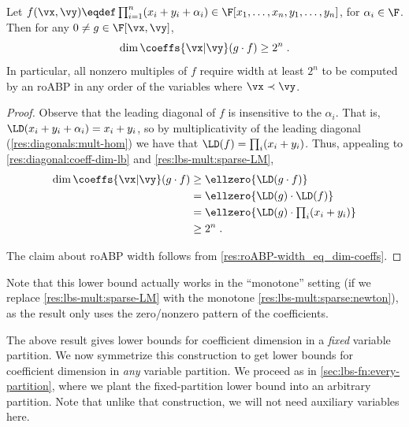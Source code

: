 \documentclass{toc}
\begin{document}
\begin{proposition}\label{prop:good-f-roabp}
        Let $f(\vx,\vy)\eqdef\prod_{i=1}^n (x_i+y_i+\alpha_i)\in\F[x_1,\ldots,x_n,y_1,\ldots,y_n]$, for $\alpha_i\in\F$.  Then for any $0\ne g\in\F[\vx,\vy]$,
        \[
                \dim\coeffs{\vx|\vy}(g\cdot f)\ge 2^n
                \;.
        \]
        In particular, all nonzero multiples of $f$ require width at least $2^n$ to be computed by an roABP in any order of the variables where $\vx\prec \vy$.
\end{proposition}
\begin{proof}
        Observe that the leading diagonal of $f$ is insensitive to the $\alpha_i$.  That is, $\LD(x_i+y_i+\alpha_i)=x_i+y_i$, so by multiplicativity of the leading diagonal (\autoref{res:diagonals:mult-hom}) we have that $\LD(f)=\prod_i (x_i+y_i)$.  Thus, appealing to \autoref{res:diagonal:coeff-dim-lb} and \autoref{res:lbs-mult:sparse-LM},
        \begin{align*}
                \dim\coeffs{\vx|\vy}(g\cdot f)
                &\ge \ellzero{\LD(g\cdot f)}\\
                &=\ellzero{\LD(g)\cdot \LD(f)}\\
                &=\textstyle\ellzero{\LD(g)\cdot \prod_i (x_i+y_i)}\\
                &\ge 2^n
                \;.
        \end{align*}

        The claim about roABP width follows from \autoref{res:roABP-width_eq_dim-coeffs}.
\end{proof}

Note that this lower bound actually works in the ``monotone'' setting (if we replace \autoref{res:lbs-mult:sparse-LM} with the monotone \autoref{res:lbs-mult:sparse:newton}), as the result only uses the zero/nonzero pattern of the coefficients.

The above result gives lower bounds for coefficient dimension in a \emph{fixed} variable partition. We now symmetrize this construction to get lower bounds for coefficient dimension in \emph{any} variable partition.  We proceed as in \autoref{sec:lbs-fn:every-partition}, where we plant the fixed-partition lower bound into an arbitrary partition.  Note that unlike that construction, we will not need auxiliary variables here.
\end{document}
